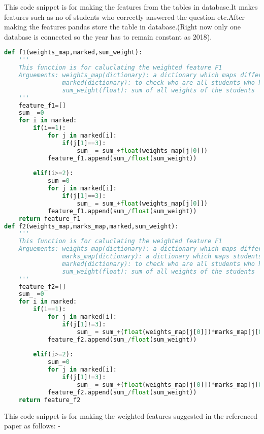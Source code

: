 \documentclass[a4paper,12pt,oneside]{book}
\begin{document}
This code snippet is for making the features from the tables in database.It makes features such as no of students who correctly answered the question etc.After making the features pandas store the table in database.(Right now only one database is connected so the year has to remain constant as 2018).\\
\begin{lstlisting}[language= Python, caption= weighted features]
def f1(weights_map,marked,sum_weight):
    '''
    This function is for caluclating the weighted feature F1
    Arguements: weights_map(dictionary): a dictionary which maps different students to the weights assigned to them
                marked(dictionary): to check who are all students who have answered a particular questions
                sum_weight(float): sum of all weights of the students
    '''
    feature_f1=[]
    sum_ =0
    for i in marked:
        if(i==1):
            for j in marked[i]:
                if(j[1]==3):
                    sum_ = sum_+float(weights_map[j[0]])
            feature_f1.append(sum_/float(sum_weight))
    
        elif(i>=2):
            sum_=0
            for j in marked[i]:
                if(j[1]==3):
                    sum_ = sum_+float(weights_map[j[0]])
            feature_f1.append(sum_/float(sum_weight))
    return feature_f1
def f2(weights_map,marks_map,marked,sum_weight):
    '''
    This function is for caluclating the weighted feature F1
    Arguements: weights_map(dictionary): a dictionary which maps different students to the weights assigned to them
                marks_map(dictionary): a dictionary which maps students to their marks
                marked(dictionary): to check who are all students who have answered a particular questions
                sum_weight(float): sum of all weights of the students
    '''
    feature_f2=[]
    sum_ =0
    for i in marked:
        if(i==1):
            for j in marked[i]:
                if(j[1]!=3):
                    sum_ = sum_+(float(weights_map[j[0]])*marks_map[j[0]])
            feature_f2.append(sum_/float(sum_weight))
        
        elif(i>=2):
            sum_=0
            for j in marked[i]:
                if(j[1]!=3):
                    sum_ = sum_+(float(weights_map[j[0]])*marks_map[j[0]])
            feature_f2.append(sum_/float(sum_weight))
    return feature_f2
\end{lstlisting}
This code snippet is for making the weighted features suggested in the referenced paper as follows: - \\
\end{document}
